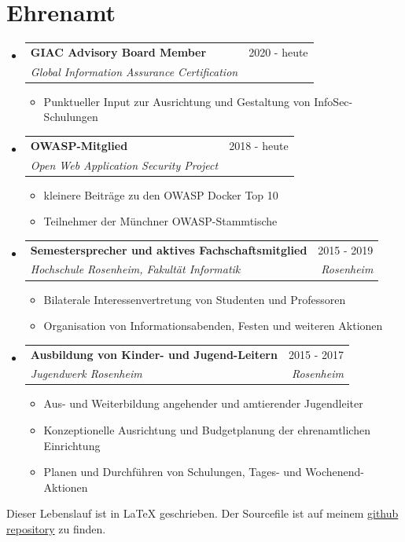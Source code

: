 \documentclass[letterpaper,11pt]{article}
\makeatletter
\newcommand{\resumeItemWithoutHeadline}[1]{
	\item\small{
		{#1 \vspace{-2pt}}
	}
}
\newcommand{\resumeSubheading}[4]{
  \vspace{-1pt}\item
    \begin{tabular*}{0.97\textwidth}[t]{l@{\extracolsep{\fill}}r}
      \textbf{#1} & #2 \\
      \textit{\small#3} & \textit{\small #4} \\
    \end{tabular*}\vspace{-5pt}
}
\newcommand{\resumeSubHeadingListStart}{\begin{itemize}[leftmargin=*]}
\newcommand{\resumeSubHeadingListEnd}{\end{itemize}}
\newcommand{\resumeItemListStart}{\begin{itemize}}
\newcommand{\resumeItemListEnd}{\end{itemize}\vspace{-5pt}}
\makeatother
\begin{document}
\section{Ehrenamt}
  \resumeSubHeadingListStart  
  	
  	\resumeSubheading
  	{GIAC Advisory Board Member}{2020 - heute}
  	{Global Information Assurance Certification}{}
  	\resumeItemListStart
  		\resumeItemWithoutHeadline
  		{Punktueller Input zur Ausrichtung und Gestaltung von InfoSec-Schulungen}
  	\resumeItemListEnd
  	
  	\resumeSubheading
  	{OWASP-Mitglied}{2018 - heute}
  	{Open Web Application Security Project}{}
  	\resumeItemListStart
  		\resumeItemWithoutHeadline
  		{kleinere Beiträge zu den OWASP Docker Top 10}
  		\resumeItemWithoutHeadline
  		{Teilnehmer der Münchner OWASP-Stammtische}
  	\resumeItemListEnd
  	  
	\resumeSubheading
	{Semestersprecher und aktives Fachschaftsmitglied}{2015 - 2019}
	{Hochschule Rosenheim, Fakultät Informatik}{Rosenheim}
	\resumeItemListStart
		\resumeItemWithoutHeadline
		{Bilaterale Interessenvertretung von Studenten und Professoren}
		\resumeItemWithoutHeadline
		{Organisation von Informationsabenden, Festen und weiteren Aktionen}
	\resumeItemListEnd
	
	\resumeSubheading
	{Ausbildung von Kinder- und Jugend-Leitern}{2015 - 2017}
	{Jugendwerk Rosenheim}{Rosenheim}
	\resumeItemListStart
		\resumeItemWithoutHeadline
		{Aus- und Weiterbildung angehender und amtierender Jugendleiter}
		\resumeItemWithoutHeadline
		{Konzeptionelle Ausrichtung und Budgetplanung der ehrenamtlichen Einrichtung}
		\resumeItemWithoutHeadline
		{Planen und Durchführen von Schulungen, Tages- und Wochenend-Aktionen}
	\resumeItemListEnd
	
  \resumeSubHeadingListEnd

\raggedleft 
\tiny{Dieser Lebenslauf ist in LaTeX geschrieben. Der Sourcefile ist auf meinem \href{https://github.com/gramsimamsi/resume/blob/master/lukas_grams_resume.tex}{github repository} zu finden. }
\end{document}
